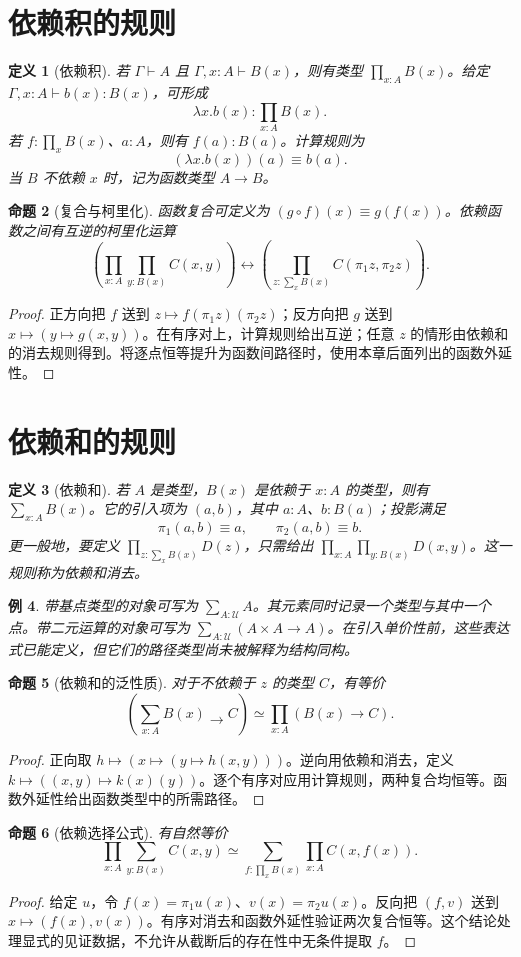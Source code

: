 \documentclass[12pt,oneside,openany,fontset=none]{ctexbook}
\theoremstyle{cn}
\newtheorem{definition}{定义}[chapter]
\newtheorem{example}[definition]{例}
\newtheorem{proposition}[definition]{命题}
\numberwithin{equation}{chapter}
\newcommand{\U}{\mathcal U}
\begin{document}
\section{依赖积的规则}
\begin{definition}[依赖积]
若 $\Gamma\vdash A$ 且 $\Gamma,x:A\vdash B(x)$，则有类型 $\prod_{x:A}B(x)$。给定 $\Gamma,x:A\vdash b(x):B(x)$，可形成
\[
\lambda x.b(x):\prod_{x:A}B(x).
\]
若 $f:\prod_xB(x)$、$a:A$，则有 $f(a):B(a)$。计算规则为
\[
(\lambda x.b(x))(a)\equiv b(a).
\]
当 $B$ 不依赖 $x$ 时，记为函数类型 $A\to B$。
\end{definition}
\begin{proposition}[复合与柯里化]
函数复合可定义为 $(g\circ f)(x)\equiv g(f(x))$。依赖函数之间有互逆的柯里化运算
\[
\left(\prod_{x:A}\prod_{y:B(x)}C(x,y)\right)
\longleftrightarrow
\left(\prod_{z:\sum_xB(x)}C(\pi_1z,\pi_2z)\right).
\]
\end{proposition}
\begin{proof}
正方向把 $f$ 送到 $z\mapsto f(\pi_1z)(\pi_2z)$；反方向把 $g$ 送到 $x\mapsto(y\mapsto g(x,y))$。在有序对上，计算规则给出互逆；任意 $z$ 的情形由依赖和的消去规则得到。将逐点恒等提升为函数间路径时，使用本章后面列出的函数外延性。
\end{proof}

\section{依赖和的规则}
\begin{definition}[依赖和]
若 $A$ 是类型，$B(x)$ 是依赖于 $x:A$ 的类型，则有 $\sum_{x:A}B(x)$。它的引入项为 $(a,b)$，其中 $a:A$、$b:B(a)$；投影满足
\[
\pi_1(a,b)\equiv a,\qquad \pi_2(a,b)\equiv b.
\]
更一般地，要定义 $\prod_{z:\sum_xB(x)}D(z)$，只需给出 $\prod_{x:A}\prod_{y:B(x)}D(x,y)$。这一规则称为依赖和消去。
\end{definition}
\begin{example}
带基点类型的对象可写为 $\sum_{A:\U}A$。其元素同时记录一个类型与其中一个点。带二元运算的对象可写为 $\sum_{A:\U}(A\times A\to A)$。在引入单价性前，这些表达式已能定义，但它们的路径类型尚未被解释为结构同构。
\end{example}
\begin{proposition}[依赖和的泛性质]
对于不依赖于 $z$ 的类型 $C$，有等价
\[
\left(\sum_{x:A}B(x)\to C\right)
\simeq\prod_{x:A}(B(x)\to C).
\]
\end{proposition}
\begin{proof}
正向取 $h\mapsto(x\mapsto(y\mapsto h(x,y)))$。逆向用依赖和消去，定义 $k\mapsto((x,y)\mapsto k(x)(y))$。逐个有序对应用计算规则，两种复合均恒等。函数外延性给出函数类型中的所需路径。
\end{proof}
\begin{proposition}[依赖选择公式]
有自然等价
\[
\prod_{x:A}\sum_{y:B(x)}C(x,y)
\simeq
\sum_{f:\prod_xB(x)}\prod_{x:A}C(x,f(x)).
\]
\end{proposition}
\begin{proof}
给定 $u$，令 $f(x)=\pi_1u(x)$、$v(x)=\pi_2u(x)$。反向把 $(f,v)$ 送到 $x\mapsto(f(x),v(x))$。有序对消去和函数外延性验证两次复合恒等。这个结论处理显式的见证数据，不允许从截断后的存在性中无条件提取 $f$。
\end{proof}
\end{document}
